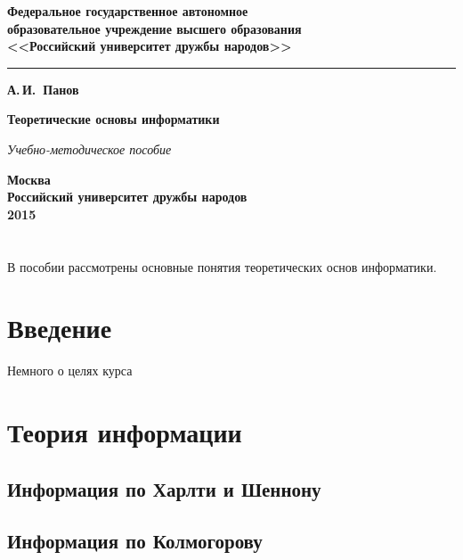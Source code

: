 \documentclass[b5paper,11pt]{book}
\begin{document}
	\begin{titlepage}
		\begin{center}
			{\bfseries  Федеральное государственное автономное \\
				образовательное учреждение высшего образования\\
				<<Российский университет дружбы народов>>
				
			}

			\vspace{-5pt}
			\noindent\rule{\textwidth}{2pt}
			
			\vspace{50pt}
			{\Large\bfseries А.\,И.~Панов}
			
			\vspace{100pt}
			{\Huge\bfseries Теоретические основы информатики}
			
			\vspace{20pt}
			{\Large\itshape Учебно-методическое пособие}
			
			\vfill
			{\bfseries Москва\\
				Российский университет дружбы народов\\
				2015
			}
		\end{center}
	\end{titlepage}
	
	\chapter*{}
	
	В пособии рассмотрены основные понятия теоретических основ информатики.
	
	
	\tableofcontents %
		
	\chapter*{Введение}
	Немного о целях курса
	
	\chapter{Теория информации}
	
	\section{Информация по Харлти и Шеннону}
	\section{Информация по Колмогорову}
\end{document}
